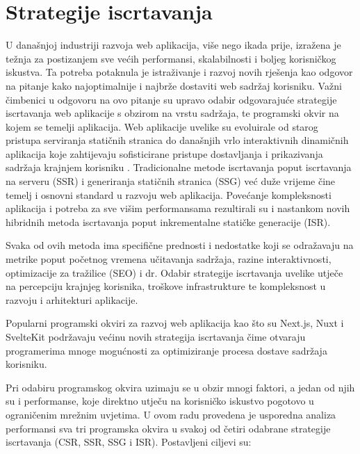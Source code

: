 \section{Strategije iscrtavanja}

U današnjoj industriji razvoja web aplikacija, više nego ikada prije, izražena je težnja za postizanjem sve većih performansi, skalabilnosti i boljeg korisničkog iskustva. Ta potreba potaknula je istraživanje i razvoj novih rješenja kao odgovor na pitanje kako najoptimalnije i najbrže dostaviti web sadržaj korisniku. Važni čimbenici u odgovoru na ovo pitanje su upravo odabir odgovarajuće strategije iscrtavanja web aplikacije s obzirom na vrstu sadržaja, te programski okvir na kojem se temelji aplikacija. Web aplikacije uvelike su evoluirale od starog pristupa serviranja statičnih stranica do današnjih vrlo interaktivnih dinamičnih aplikacija koje zahtijevaju sofisticirane pristupe dostavljanja i prikazivanja sadržaja krajnjem korisniku \cite{moore2024rendering}. Tradicionalne metode iscrtavanja poput iscrtavanja na serveru (SSR) i generiranja statičnih stranica (SSG) već duže vrijeme čine temelj i osnovni standard u razvoju web aplikacija. Povećanje kompleksnosti aplikacija i potreba za sve višim performansama rezultirali su i nastankom novih hibridnih metoda iscrtavanja poput inkrementalne statičke generacije (ISR).

\bigskip

Svaka od ovih metoda ima specifične prednosti i nedostatke koji se odražavaju na metrike poput početnog vremena učitavanja sadržaja, razine interaktivnosti, optimizacije za tražilice (SEO) i dr. Odabir strategije iscrtavanja uvelike utječe na percepciju krajnjeg korisnika, troškove infrastrukture te kompleksnost u razvoju i arhitekturi aplikacije.

\bigskip

Popularni programski okviri za razvoj web aplikacija kao što su Next.js, Nuxt i SvelteKit podržavaju većinu novih strategija iscrtavanja čime otvaraju programerima mnoge mogućnosti za optimiziranje procesa dostave sadržaja korisniku.

\bigskip

Pri odabiru programskog okvira uzimaju se u obzir mnogi faktori, a jedan od njih su i performanse, koje direktno utječu na korisničko iskustvo pogotovo u ograničenim mrežnim uvjetima.
U ovom radu provedena je usporedna analiza performansi sva tri programska okvira u svakoj od  četiri odabrane strategije iscrtavanja (CSR, SSR, SSG i ISR). Postavljeni ciljevi su:

